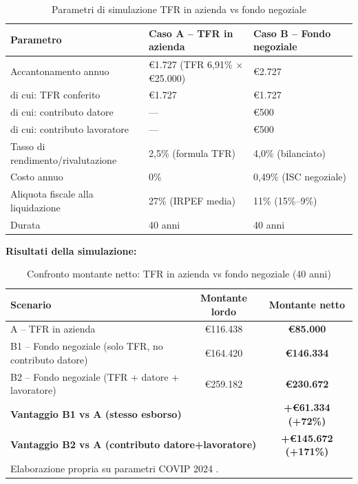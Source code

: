 \begin{table}[h!]
\centering
\small
\caption{Parametri di simulazione TFR in azienda vs fondo negoziale}
\label{tab:parametri_sim}
\begin{tabular}{lll}
\toprule
\textbf{Parametro} & \textbf{Caso A -- TFR in azienda}
                   & \textbf{Caso B -- Fondo negoziale} \\
\midrule
Accantonamento annuo & €1.727 (TFR 6,91\% × €25.000) & €2.727 \\
\quad di cui: TFR conferito & €1.727 & €1.727 \\
\quad di cui: contributo datore & --- & €500 \\
\quad di cui: contributo lavoratore & --- & €500 \\
Tasso di rendimento/rivalutazione & 2,5\% (formula TFR) & 4,0\% (bilanciato) \\
Costo annuo & 0\% & 0,49\% (ISC negoziale) \\
Aliquota fiscale alla liquidazione & 27\% (IRPEF media) & 11\% (15\%--9\%) \\
Durata & 40 anni & 40 anni \\
\bottomrule
\end{tabular}
\end{table}

\medskip
\noindent\textbf{Risultati della simulazione:}

\begin{table}[h!]
\centering
\small
\caption{Confronto montante netto: TFR in azienda vs fondo negoziale (40 anni)}
\label{tab:risultati_sim}
\begin{tabular}{lcc}
\toprule
\textbf{Scenario} & \textbf{Montante lordo} & \textbf{Montante netto} \\
\midrule
A -- TFR in azienda
    & €116.438 & \textbf{€85.000} \\
B1 -- Fondo negoziale (solo TFR, no contributo datore)
    & €164.420 & \textbf{€146.334} \\
B2 -- Fondo negoziale (TFR + datore + lavoratore)
    & €259.182 & \textbf{€230.672} \\
\midrule
\multicolumn{2}{l}{\textbf{Vantaggio B1 vs A (stesso esborso)}}
    & \textbf{+€61.334 (+72\%)} \\
\multicolumn{2}{l}{\textbf{Vantaggio B2 vs A (contributo datore+lavoratore)}}
    & \textbf{+€145.672 (+171\%)} \\
\bottomrule
\multicolumn{3}{l}{\small Elaborazione propria su parametri COVIP 2024 \cite{COVIP2025, web:65}.}
\end{tabular}
\end{table}

